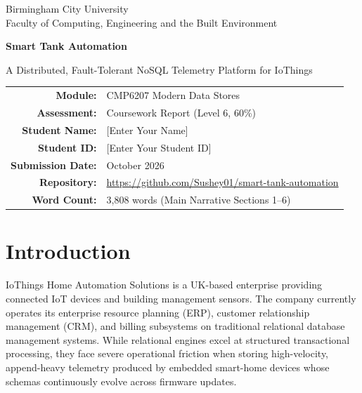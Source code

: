 \documentclass[11pt,a4paper]{article}
\begin{document}
\begin{titlepage}
\centering
\vspace*{1cm}
{\large Birmingham City University\\Faculty of Computing, Engineering and the Built Environment\par}
\vspace{2cm}
{\Huge\bfseries Smart Tank Automation\par}
\vspace{0.4cm}
{\Large A Distributed, Fault-Tolerant NoSQL Telemetry Platform for IoThings\par}
\vspace{2cm}
\begin{tabular}{rl}
\textbf{Module:} & CMP6207 Modern Data Stores\\
\textbf{Assessment:} & Coursework Report (Level 6, 60\%)\\
\textbf{Student Name:} & [Enter Your Name]\\
\textbf{Student ID:} & [Enter Your Student ID]\\
\textbf{Submission Date:} & October 2026\\
\textbf{Repository:} & \url{https://github.com/Sushey01/smart-tank-automation}\\
\textbf{Word Count:} & 3,808 words (Main Narrative Sections 1--6)\\
\end{tabular}
\vfill
{}
\end{titlepage}

\tableofcontents
\clearpage
\listoffigures
\listoftables
\clearpage

\section{Introduction}

IoThings Home Automation Solutions is a UK-based enterprise providing connected IoT devices and building management sensors. The company currently operates its enterprise resource planning (ERP), customer relationship management (CRM), and billing subsystems on traditional relational database management systems. While relational engines excel at structured transactional processing, they face severe operational friction when storing high-velocity, append-heavy telemetry produced by embedded smart-home devices whose schemas continuously evolve across firmware updates.
\end{document}
